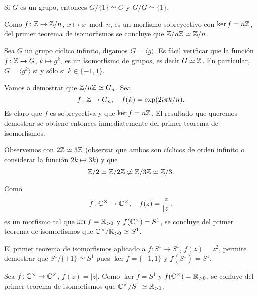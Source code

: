 \begin{examples}
Si $G$ es un grupo, entonces $G/\{1\}\simeq G$ y $G/G\simeq\{1\}$. 
\end{examples}

\begin{example}
Como $f\colon\mathbb{Z}\to\mathbb{Z}/n$, $x\mapsto x\bmod n$, es un morfismo sobreyectivo con $\ker f=n\mathbb{Z}$, del primer teorema de isomorfismos se concluye que 
$\mathbb{Z}/n\mathbb{Z}\simeq\mathbb{Z}/n$. 	
\end{example}

\begin{example}
Sea $G$ un grupo cíclico infinito, digamos $G=\langle g\rangle$. Es fácil verificar que la función $f\colon\mathbb{Z}\to G$, $k\mapsto g^k$, 
es un isomorfismo de grupos, es decir $G\simeq\mathbb{Z}$. En particular, $G=\langle g^k\rangle$ si y sólo si $k\in\{-1,1\}$. 
\end{example}

\begin{example}
Vamos a demostrar que 
$\mathbb{Z}/n\mathbb{Z}\simeq G_n$. Sea 
\[
f\colon\mathbb{Z}\to G_n,\quad
f(k)=\exp(2i\pi k/n).
\]
Es claro que $f$ es sobreyectiva y que $\ker f=n\mathbb{Z}$. El resultado que queremos demostrar se obtiene entonces inmediatemente del primer teorema de isomorfismos.	
\end{example}

\begin{example}
Observemos con $2\mathbb{Z}\simeq 3\mathbb{Z}$ (observar que ambos son cíclicos de orden infinito o considerar la función $2k\mapsto 3k$) y que 
\[
\mathbb{Z}/2\simeq\mathbb{Z}/2\mathbb{Z}\not\simeq\mathbb{Z}/3\mathbb{Z}\simeq\mathbb{Z}/3.
\]
\end{example}

\begin{example}
Como 
\[
f\colon\mathbb{C}^\times\to\mathbb{C}^\times, 
\quad
f(z)=\frac{z}{|z|},
\]
es un morfismo tal que $\ker f=\mathbb{R}_{>0}$ y $f(\mathbb{C}^\times)=S^1$, se concluye del primer teorema
de isomorfismos que $\mathbb{C}^\times/\mathbb{R}_{>0}\simeq S^1$.  
\end{example}

\begin{example}
El primer teorema de isomorfismos aplicado a $f\colon S^1\to S^1$, $f(z)=z^2$, permite demostrar que $S^1/\{\pm1\}\simeq S^1$ pues
$\ker f=\{-1,1\}$ y $f(S^1)=S^1$. 	
\end{example}

\begin{example}
Sea $f\colon\mathbb{C}^\times\to\mathbb{C}^\times$, $f(z)=|z|$. Como $\ker f=S^1$ y $f(\mathbb{C}^\times)=\mathbb{R}_{>0}$, se conluye del primer teorema
de isomorfismos que $\mathbb{C}^\times/S^1\simeq\mathbb{R}_{>0}$. 
\end{example}

